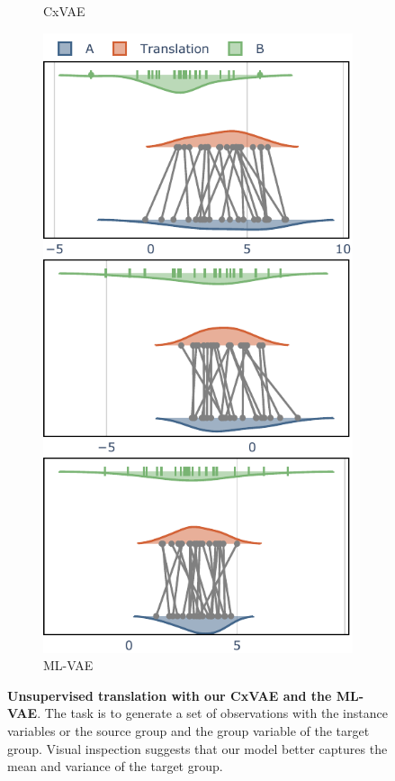 \documentclass[nohyperref]{article}
\theoremstyle{plain}
\theoremstyle{definition}
\theoremstyle{remark}
\begin{document}
\begin{figure}[t]
\begin{center}
\begin{subfigure}{0.49\columnwidth}
    \caption{CxVAE}
\end{subfigure}
\hfill
\begin{subfigure}{0.49\columnwidth}
    \includegraphics[width=\textwidth]{files/trans_theirs.pdf}
    \caption{ML-VAE}
\end{subfigure}
    \caption{\textbf{Unsupervised translation with our CxVAE and the ML-VAE}.  The task is to generate a set of observations with the instance variables or the source group and the group variable of the target group. Visual inspection suggests that our model better captures the mean and variance of the target group.}
    \label{fig:trans}
    \end{center}
    \vskip -0.2in
\end{figure}
\end{document}
